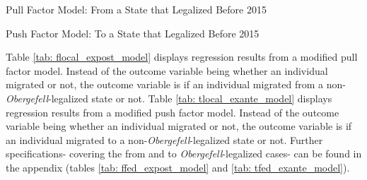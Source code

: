 \documentclass[12pt,letterpaper]{article}
\begin{document}
\begin{table}[htbp]
    \centering
    \caption{Pull Factor Model: From a State that Legalized Before 2015}
    \label{tab: flocal_expost_model}
    
\end{table}
\begin{table}[htbp] %
    \centering
    \caption{Push Factor Model: To a State that Legalized Before 2015}
    \label{tab: tlocal_exante_model}
    
\end{table}

Table \ref{tab: flocal_expost_model} displays regression results from a modified pull factor model. Instead of the outcome variable being whether an individual migrated or not, the outcome variable is if an individual migrated from a non-\textit{Obergefell}-legalized state or not. Table \ref{tab: tlocal_exante_model} displays regression results from a modified push factor model. Instead of the outcome variable being whether an individual migrated or not, the outcome variable is if an individual migrated to a non-\textit{Obergefell}-legalized state or not. Further specifications- covering the from and to \textit{Obergefell}-legalized cases- can be found in the appendix (tables \ref{tab: ffed_expost_model} and \ref{tab: tfed_exante_model}).
\end{document}
